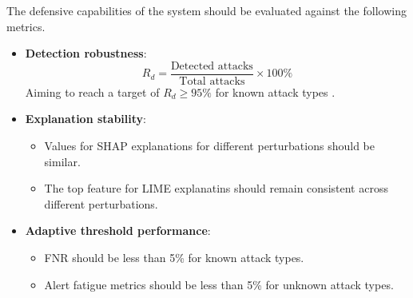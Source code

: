 \noindent The defensive capabilities of the system should be evaluated against the following metrics.

\begin{itemize}
  \item \textbf{Detection robustness}:
  \begin{equation}
    R_d = \frac{\text{Detected attacks}}{\text{Total attacks}} \times 100\%
  \end{equation}
  Aiming to reach a target of $R_d \geq 95\%$ for known attack types \citep{atlam2022business}.
  \item \textbf{Explanation stability}:
  \begin{itemize}
    \item Values for SHAP explanations for different perturbations should be similar.
    \item The top feature for LIME explanatins should remain consistent across different perturbations.
  \end{itemize}
  \item \textbf{Adaptive threshold performance}:
  \begin{itemize}
    \item FNR should be less than 5\% for known attack types.
    \item Alert fatigue metrics should be less than 5\% for unknown attack types.
  \end{itemize}
\end{itemize}
